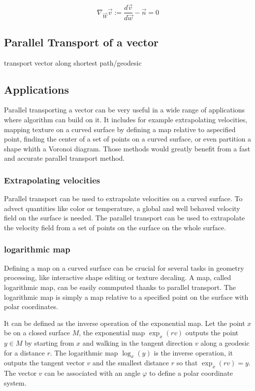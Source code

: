 \documentclass[sigconf]{acmart}
\begin{document}
\begin{equation}
  \nabla_{\vec{W}}\vec{v}:=\frac{d\vec{v}}{d\vec{w}}-\vec{n}=0
  \label{eq:covariant derivative}
\end{equation}

\subsection{Parallel Transport of a vector}

transport vector along shortest path/geodesic

\subsection{Applications}
Parallel transporting a vector can be very useful in a wide range of applications where algorithm can build on it. It includes for example extrapolating velocities, mapping texture on a curved surface by defining a map relative to aspecified point, finding the center of a set of points on a curved surface, or even partition a shape whith a Voronoi diagram. Those methods would greatly benefit from a fast and accurate parallel transport method.

\subsubsection{Extrapolating velocities}
Parallel transport can be used to extrapolate velocities on a curved surface. To advect quantities like color or temperature, a global and well behaved velocity field on the surface is needed. The parallel transport can be used to extrapolate the velocity field from a set of points on the surface on the whole surface.

\subsubsection{logarithmic map}
Defining a map on a curved surface can be crucial for several tasks in geometry processing, like interactive shape editing or texture decaling. A map, called logarithmic map, can be easily commputed thanks to parallel transport. The logarithmic map is simply a map relative to a specified point on the surface with polar coordinates. 

It can be defined as the inverse operation of the exponential map. Let the point $x$ be on a closed surface $M$, the exponential map $\exp_x (rv)$ outputs the point $y\in M$ by starting from $x$ and walking in the tangent direction $v$ along a geodesic for a distance $r$. The logarithmic map $\log_x(y)$ is the inverse operation, it outputs the tangent vector $v$ and the smallest distance $r$ so that $\exp_x (rv)=y$. The vector $v$ can be associated with an angle $\varphi$ to define a polar coordinate system.
\end{document}
